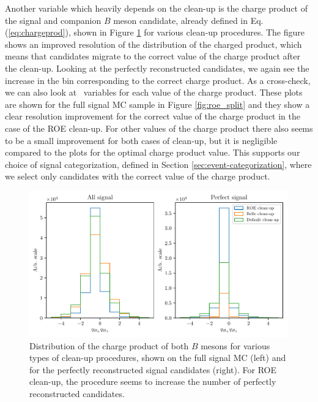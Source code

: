 Another variable which heavily depends on the clean-up is the charge product of the signal and companion $B$ meson candidate, already defined in Eq. (\ref{eq:chargeprod}), shown in Figure \ref{fig:roe_chargeproduct} for various clean-up procedures. The figure shows an improved resolution of the distribution of the charged product, which means that candidates migrate to the correct value of the charge product after the clean-up. Looking at the perfectly reconstructed candidates, we again see the increase in the bin corresponding to the correct charge product. As a cross-check, we can also look at \vars~variables for each value of the charge product. These plots are shown for the full signal MC sample in Figure \ref{fig:roe_split} and they show a clear resolution improvement for the correct value of the charge product in the case of the ROE clean-up. For other values of the charge product there also seems to be a small improvement for both cases of clean-up, but it is negligible compared to the plots for the optimal charge product value. This supports our choice of signal categorization, defined in Section \ref{sec:event-categorization}, where we select only candidates with the correct value of the charge product.

\begin{figure}[H]
	\centering
	\captionsetup{width=0.8\linewidth}
	\includegraphics[width=\linewidth]{fig/roe_chargeprod}
	\caption{Distribution of the charge product of both $B$ mesons for various types of clean-up procedures, shown on the full signal MC (left) and for the perfectly reconstructed signal candidates (right). For ROE clean-up, the procedure seems to increase the number of perfectly reconstructed candidates.}
	\label{fig:roe_chargeproduct}
\end{figure}

